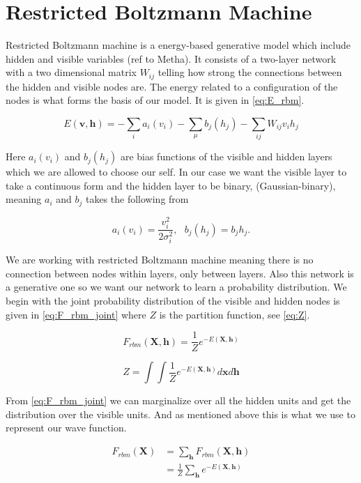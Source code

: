 \section{Restricted Boltzmann Machine}\label{sec:rbm}

Restricted Boltzmann machine is a energy-based generative model which include hidden and visible variables (ref to Metha). It consists of a two-layer network with a two dimensional matrix $W_{ij}$ telling how strong the connections between the hidden and visible nodes are. The energy related to a configuration of the nodes is what forms the basis of our model. It is given in \eqref{eq:E_rbm}.

\begin{equation}\label{eq:E_rbm}
E(\mathbf{v}, \mathbf{h}) = - \sum_{i} a_i(v_i) - \sum_{\mu} b_j(h_j) - \sum_{ij} W_{ij}v_i h_j 
\end{equation}

Here $a_i(v_i)$ and $b_j(h_j)$ are bias functions of the visible and hidden layers which we are allowed to choose our self. In our case we want the visible layer to take a continuous form and the hidden layer to be binary, (Gaussian-binary), meaning $a_i$ and $b_j$ takes the following from

$$a_i(v_i) = \frac{v_i^2}{2 \sigma_i^2}, \ \ \ b_j(h_j)= b_jh_j.$$

We are working with restricted Boltzmann machine meaning there is no connection between nodes within layers, only between layers. Also this network is a generative one so we want our network to learn a probability distribution. We begin with the joint probability distribution of the visible and hidden nodes is given in \eqref{eq:F_rbm_joint} where $Z$ is the partition function, see \eqref{eq:Z}. 

\begin{equation}\label{eq:F_rbm_joint}
F_{rbm} (\mathbf{X}, \mathbf{h}) = \frac{1}{Z} e^{-E(\mathbf{X}, \mathbf{h})}
\end{equation}

\begin{equation}\label{eq:Z}
Z = \int \int \frac{1}{Z} e^{-E(\mathbf{X}, \mathbf{h})} d\mathbf{x}d\mathbf{h}
\end{equation}

From \eqref{eq:F_rbm_joint} we can marginalize over all the hidden units and get the distribution over the visible units. And as mentioned above this is what we use to represent our wave function. 

\begin{align}\label{eq:F_rbm_marg}
F_{rbm} (\mathbf{X}) &= \sum_{\mathbf{h}} F_{rbm} (\mathbf{X}, \mathbf{h}) \\
&= \frac{1}{Z} \sum_{\mathbf{h}} e^{-E(\mathbf{X}, \mathbf{h})}
\end{align}

